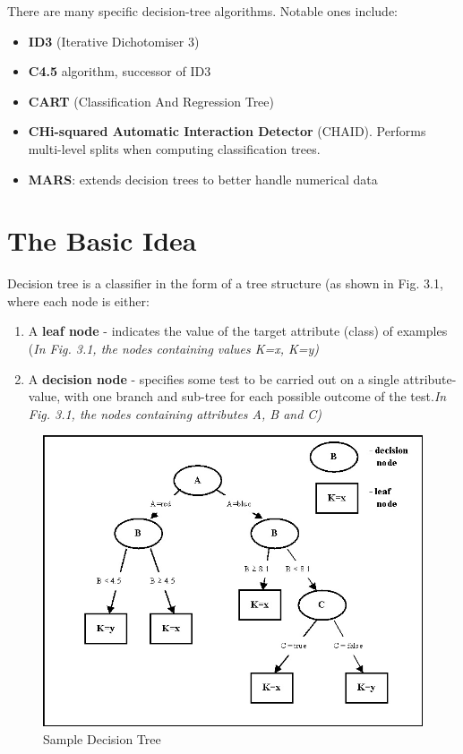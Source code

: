 \documentclass[12pt]{report}
\begin{document}
There are many specific decision-tree algorithms. Notable ones include:

\begin{itemize}
\item{\textbf{ID3} (Iterative Dichotomiser 3)}
\item{\textbf{C4.5} algorithm, successor of ID3}
\item{\textbf{CART} (Classification And Regression Tree)}
\item{\textbf{CHi-squared Automatic Interaction Detector }(CHAID). Performs multi-level splits when computing classification trees.}
\item{\textbf{MARS}: extends decision trees to better handle numerical data}
\end{itemize}


\section{The Basic Idea}

Decision tree is a classifier in the form of a tree structure (as shown in Fig. 3.1, where each node is either:
\begin{enumerate}
\item{A \textbf{leaf node} - indicates the value of the target attribute (class) of examples} (\textit{In Fig. 3.1, the nodes containing values K=x, K=y)}
\item{A \textbf{decision node} - specifies some test to be carried out on a single attribute-value, with one branch and sub-tree for each possible outcome of the test.\textit{In Fig. 3.1, the nodes containing attributes A, B and C)}}

\end{enumerate}

\begin{figure}[h!]
	\centering
		\includegraphics[scale=1.0]{dtreeexample.jpg}
	\caption{Sample Decision Tree}
	\label{fig:logo2}
\end{figure}
\end{document}
